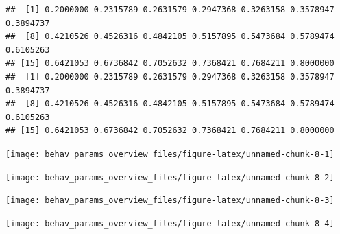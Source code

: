 \documentclass[
]{article}
\begin{document}
\begin{verbatim}
##  [1] 0.2000000 0.2315789 0.2631579 0.2947368 0.3263158 0.3578947 0.3894737
##  [8] 0.4210526 0.4526316 0.4842105 0.5157895 0.5473684 0.5789474 0.6105263
## [15] 0.6421053 0.6736842 0.7052632 0.7368421 0.7684211 0.8000000
##  [1] 0.2000000 0.2315789 0.2631579 0.2947368 0.3263158 0.3578947 0.3894737
##  [8] 0.4210526 0.4526316 0.4842105 0.5157895 0.5473684 0.5789474 0.6105263
## [15] 0.6421053 0.6736842 0.7052632 0.7368421 0.7684211 0.8000000
\end{verbatim}

\begin{center}\texttt{[image: behav\_params\_overview\_files/figure-latex/unnamed-chunk-8-1]} \end{center}

\begin{center}\texttt{[image: behav\_params\_overview\_files/figure-latex/unnamed-chunk-8-2]} \end{center}

\begin{center}\texttt{[image: behav\_params\_overview\_files/figure-latex/unnamed-chunk-8-3]} \end{center}

\begin{center}\texttt{[image: behav\_params\_overview\_files/figure-latex/unnamed-chunk-8-4]} \end{center}
\end{document}
